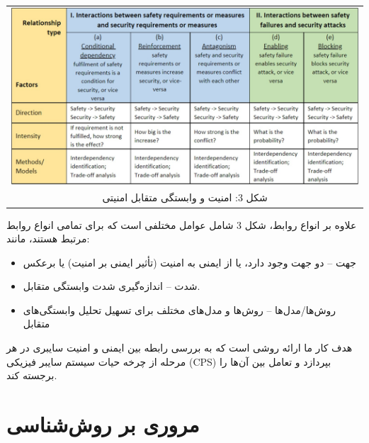 \documentclass[a4paper,10pt]{article}
\begin{document}
        \begin{table}
            
            \centering
            \begin{tabular}{ c }
                
                \includegraphics[width=1\textwidth]{Image/fig3.jpg} \\

                شکل 3: امنیت و وابستگی متقابل امنیتی

            \end{tabular}

        \end{table}

        علاوه بر انواع روابط، شکل 3 شامل عوامل مختلفی است که برای تمامی انواع روابط مرتبط هستند، مانند:
        
        \begin{itemize}
            
            \item جهت – دو جهت وجود دارد، یا از ایمنی به امنیت (تأثیر ایمنی بر امنیت) یا برعکس
            
            \item شدت – اندازه‌گیری شدت وابستگی متقابل.

            \item روش‌ها/مدل‌ها – روش‌ها و مدل‌های مختلف برای تسهیل تحلیل وابستگی‌های متقابل

        \end{itemize}

        هدف کار ما ارائه روشی است که به بررسی رابطه بین ایمنی و امنیت سایبری در هر مرحله از چرخه حیات سیستم سایبر فیزیکی (CPS) بپردازد و تعامل بین آن‌ها را برجسته کند.

    \section{مروری بر روش‌شناسی}
\end{document}

